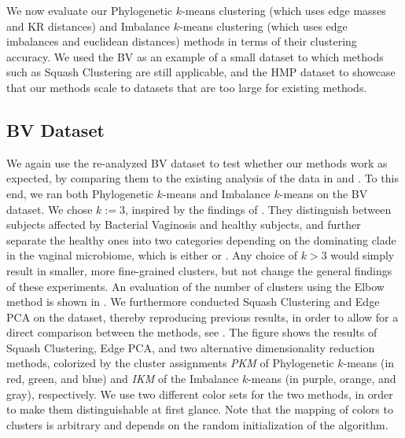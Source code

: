 We now evaluate our Phylogenetic $k$-means clustering (which uses edge masses and KR distances) and
Imbalance $k$-means clustering (which uses edge imbalances and euclidean distances) methods in terms of their clustering accuracy.
We used the \ac{BV} as an example of a small dataset to which methods such as Squash Clustering \cite{Matsen2011a} are still applicable,
and the \ac{HMP} dataset to showcase that our methods scale to datasets that are too large for existing methods.


\subsection{BV Dataset}
\label{ch:Clustering:sec:Results:sub:BVDataset}

We again use the re-analyzed \ac{BV} dataset to test whether our methods work as expected,
by comparing them to the existing analysis of the data in \cite{Srinivasan2012} and \cite{Matsen2011a}.
To this end, we ran both Phylogenetic $k$-means and Imbalance $k$-means on the \ac{BV} dataset.
We chose $k:=3$, inspired by the findings of \cite{Srinivasan2012}.
They distinguish between subjects affected by Bacterial Vaginosis and healthy subjects,
and further separate the healthy ones into two categories depending on the dominating clade in the vaginal microbiome,
which is either  or .
Any choice of $k > 3$ would simply result in smaller, more fine-grained clusters,
but not change the general findings of these experiments.
An evaluation of the number of clusters using the Elbow method is shown in .
We furthermore conducted Squash Clustering and Edge PCA on the dataset,
thereby reproducing previous results, in order to allow for a direct comparison between the methods,
see .
The figure shows the results of Squash Clustering, Edge PCA, and two alternative dimensionality reduction methods,
colorized by the cluster assignments \emph{PKM} of Phylogenetic $k$-means (in red, green, and blue)
and \emph{IKM} of the Imbalance $k$-means (in purple, orange, and gray), respectively.
We use two different color sets for the two methods, in order to make them distinguishable at first glance.
Note that the mapping of colors to clusters is arbitrary and depends on the random initialization of the algorithm.

